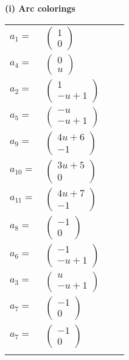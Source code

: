 \documentclass[1p]{elsarticle_modified}
\theoremstyle{definition}
\begin{document}
\flushleft \textbf{(i) Arc colorings}\\
\begin{tabular}{m{7pt} m{180pt} m{7pt} m{180pt} }
\flushright $a_{1}=$&$\begin{pmatrix}1\\0\end{pmatrix}$ \\
\flushright $a_{4}=$&$\begin{pmatrix}0\\u\end{pmatrix}$ \\
\flushright $a_{2}=$&$\begin{pmatrix}1\\- u+1\end{pmatrix}$ \\
\flushright $a_{5}=$&$\begin{pmatrix}- u\\- u+1\end{pmatrix}$ \\
\flushright $a_{9}=$&$\begin{pmatrix}4 u+6\\-1\end{pmatrix}$ \\
\flushright $a_{10}=$&$\begin{pmatrix}3 u+5\\0\end{pmatrix}$ \\
\flushright $a_{11}=$&$\begin{pmatrix}4 u+7\\-1\end{pmatrix}$ \\
\flushright $a_{8}=$&$\begin{pmatrix}-1\\0\end{pmatrix}$ \\
\flushright $a_{6}=$&$\begin{pmatrix}-1\\- u+1\end{pmatrix}$ \\
\flushright $a_{3}=$&$\begin{pmatrix}u\\- u+1\end{pmatrix}$ \\
\flushright $a_{7}=$&$\begin{pmatrix}-1\\0\end{pmatrix}$\\ \flushright $a_{7}=$&$\begin{pmatrix}-1\\0\end{pmatrix}$\\&\end{tabular}
\end{document}
